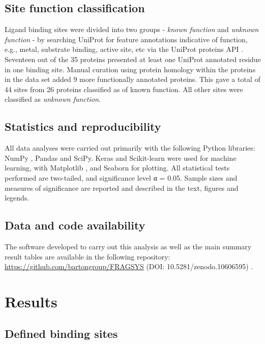 \subsection{Site function classification}

Ligand binding sites were divided into two groups - \textit{known function} and \textit{unknown function} - by searching UniProt \cite{UNIPROT_2019_UNIPROT} for feature annotations indicative of function, e.g., metal, substrate binding, active site, etc via the UniProt proteins API \cite{NIGHTINGALE_2017_API}. Seventeen out of the 35 proteins presented at least one UniProt annotated residue in one binding site. Manual curation using protein homology within the proteins in the data set added 9 more functionally annotated proteins. This gave a total of 44 sites from 26 proteins classified as of known function. All other sites were classified as \textit{unknown function}.

\subsection{Statistics and reproducibility}

All data analyses were carried out primarily with  the following Python libraries: NumPy \cite{HARRIS_2020_NUMPY}, Pandas \cite{MCKINNEY_2010_PANDAS,PANDAS_2022_PANDAS} and SciPy. Keras and Scikit-learn were used for machine learning, with Matplotlib \cite{HUNTER_2007_MATPLOTLIB}, and Seaborn \cite{WASKOM_2021_SEABORN} for plotting. All statistical tests performed are two-tailed, and significance level α = 0.05. Sample sizes and measures of significance are reported and described in the text, figures and legends.

\subsection{Data and code availability}

The software developed to carry out this analysis as well as the main summary result tables are available in the following repository: \url{https://github.com/bartongroup/FRAGSYS} (DOI: 10.5281/zenodo.10606595) \cite{UTGES_2024_FRAGSYS_ZENODO}.

\section{Results}

\subsection{Defined binding sites}


